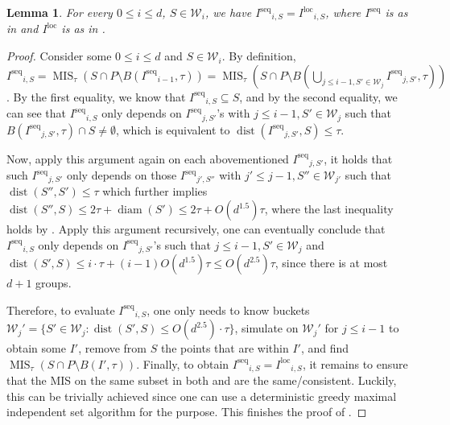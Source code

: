 \documentclass[11pt,letterpaper]{article}
\theoremstyle{plain}
\newtheorem{lemma}[theorem]{Lemma}
\theoremstyle{definition}
\theoremstyle{remark}
\DeclareMathOperator{\dist}{dist}
\DeclareMathOperator{\diam}{diam}
\DeclareMathOperator{\MIS}{MIS}
\newcommand{\Iseq}{\ensuremath{I^{\mathrm{seq}}}\xspace}
\newcommand{\Iloc}{\ensuremath{I^{\mathrm{loc}}}\xspace}
\begin{document}
\begin{lemma}
\label{lemma:couple-seq-loc}
    For every $0 \leq i \leq d$, $S \in \mathcal{W}_i$, we have $\Iseq_{i, S} = \Iloc_{i, S}$, where $\Iseq$ is as in  and $\Iloc$ is as in .
\end{lemma}
\begin{proof}
Consider some $0 \leq i \leq d$ and $S \in \mathcal{W}_i$. 
By definition, $\Iseq_{i, S} = \MIS_\tau(S \cap P \setminus B(\Iseq_{i-1}, \tau)) = \MIS_\tau(S \cap P \setminus B( \bigcup_{j \leq i-1, S' \in \mathcal{W}_j} \Iseq_{j, S'}, \tau))$. 
By the first equality, we know that $\Iseq_{i, S} \subseteq S$, and by the second equality, we can see that $\Iseq_{i, S}$ only depends on $\Iseq_{j, S'}$'s with $ j \leq i-1, S' \in \mathcal{W}_j$ such that  $B(\Iseq_{j, S'}, \tau) \cap S \neq \emptyset$, which is equivalent to $\dist(\Iseq_{j, S'}, S) \leq \tau$. 

Now, apply this argument again on each abovementioned $\Iseq_{j, S'}$, it holds that such $\Iseq_{j, S'}$ only depends on those $\Iseq_{j', S''}$ with $j' \leq j - 1, S'' \in \mathcal{W}_{j'}$ such that $\dist(S'', S') \leq \tau$ which further implies $\dist(S'', S) \leq 2\tau + \diam(S')\leq 2\tau + O(d^{1.5})\tau$, where the last inequality holds by . 
Apply this argument recursively, one can eventually conclude that $\Iseq_{i, S}$ only depends on $\Iseq_{j, S'}$'s such that $j \leq i - 1, S' \in \mathcal{W}_j$ and $\dist(S', S) \leq i \cdot \tau + (i-1)O(d^{1.5})\tau\leq O(d^{2.5})\tau$, since there is at most $d+1$ groups.


Therefore, to evaluate $\Iseq_{i, S}$, one only needs to know buckets $\mathcal{W}_j' = \{ S' \in \mathcal{W}_j : \dist(S', S) \leq O(d^{2.5}) \cdot \tau \}$, simulate  on $\mathcal{W}_j'$ for $j \leq i - 1$ to obtain some $I'$, remove from $S$ the points that are within $I'$, and find $\MIS_\tau(S \cap P \setminus B(I', \tau))$. 
Finally, to obtain $\Iseq_{i, S} = \Iloc_{i, S}$, it remains to ensure that the MIS on the same subset in both  and  are the same/consistent.
Luckily, this can be trivially achieved since one can use a deterministic greedy maximal independent set algorithm for the purpose. 
This finishes the proof of . 
\end{proof}
\end{document}
